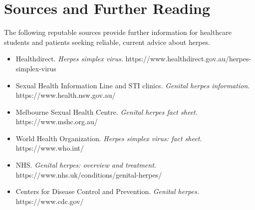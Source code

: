 \section*{Sources and Further Reading}
The following reputable sources provide further information for healthcare students and patients seeking reliable, current advice about herpes.

\begin{itemize}
    \item Healthdirect. \textit{Herpes simplex virus.} https://www.healthdirect.gov.au/herpes-simplex-virus
    \item Sexual Health Information Line and STI clinics. \textit{Genital herpes information.} https://www.health.nsw.gov.au/
    \item Melbourne Sexual Health Centre. \textit{Genital herpes fact sheet.} https://www.mshc.org.au/
    \item World Health Organization. \textit{Herpes simplex virus: fact sheet.} https://www.who.int/
    \item NHS. \textit{Genital herpes: overview and treatment.} https://www.nhs.uk/conditions/genital-herpes/
    \item Centers for Disease Control and Prevention. \textit{Genital herpes.} https://www.cdc.gov/
\end{itemize}
